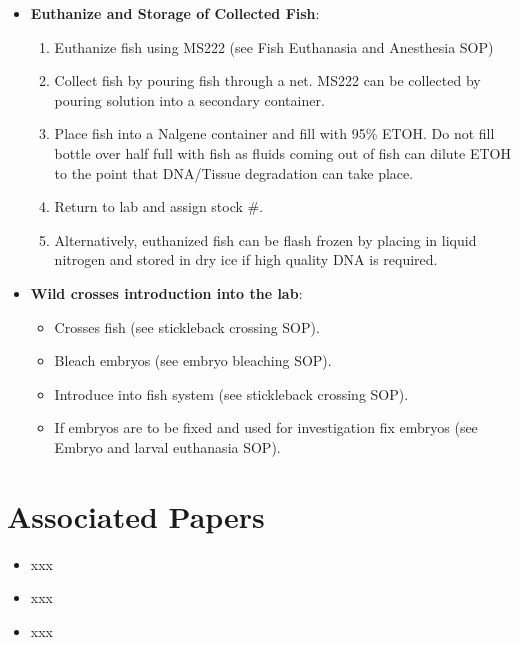 \documentclass[
  letterpaper,
  DIV=11,
  numbers=noendperiod]{scrreprt}
\providecommand{\tightlist}{%
  \setlength{\itemsep}{0pt}\setlength{\parskip}{0pt}}\usepackage{longtable,booktabs,array}
\begin{document}
\begin{itemize}
\item
  \textbf{Euthanize and Storage of Collected Fish}:

  \begin{enumerate}
  \def\labelenumi{\arabic{enumi}.}
  \tightlist
  \item
    Euthanize fish using MS222 (see Fish Euthanasia and Anesthesia SOP)
  \item
    Collect fish by pouring fish through a net. MS222 can be collected
    by pouring solution into a secondary container.
  \item
    Place fish into a Nalgene container and fill with 95\% ETOH. Do not
    fill bottle over half full with fish as fluids coming out of fish
    can dilute ETOH to the point that DNA/Tissue degradation can take
    place.
  \item
    Return to lab and assign stock \#.
  \item
    Alternatively, euthanized fish can be flash frozen by placing in
    liquid nitrogen and stored in dry ice if high quality DNA is
    required.
  \end{enumerate}
\item
  \textbf{Wild crosses introduction into the lab}:

  \begin{itemize}
  \item
    Crosses fish (see stickleback crossing SOP).
  \item
    Bleach embryos (see embryo bleaching SOP).
  \item
    Introduce into fish system (see stickleback crossing SOP).
  \item
    If embryos are to be fixed and used for investigation fix embryos
    (see Embryo and larval euthanasia SOP).
  \end{itemize}
\end{itemize}

\hypertarget{associated-papers-27}{%
\section{Associated Papers}\label{associated-papers-27}}

\begin{itemize}
\tightlist
\item
  xxx
\item
  xxx
\item
  xxx
\end{itemize}
\end{document}

